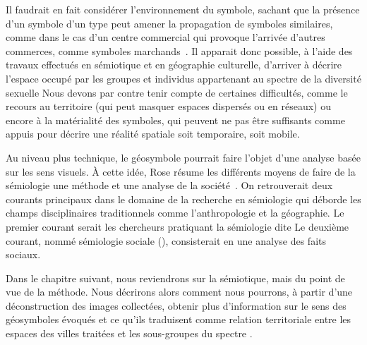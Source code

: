 Il faudrait en fait considérer l'environnement du symbole, sachant que la présence d'un symbole d'un type peut amener la propagation de symboles similaires, comme dans le cas d'un centre commercial qui provoque l'arrivée d'autres commerces, comme symboles marchands~\citep[7-8]{Monnet1998}.
Il apparait donc possible, à l'aide des travaux effectués en sémiotique et en géographie culturelle, d'arriver à décrire l'espace occupé par les groupes et individus appartenant au spectre de la diversité sexuelle
Nous devons par contre tenir compte de certaines difficultés, comme le recours au territoire (qui peut masquer espaces dispersés ou en réseaux) ou encore à la matérialité des symboles, qui peuvent ne pas être suffisants comme appuis pour décrire une réalité spatiale soit temporaire, soit mobile.

Au niveau plus technique, le géosymbole pourrait faire l'objet d'une analyse basée sur les sens visuels.
À cette idée, Rose résume les différents moyens de faire de la sémiologie une méthode et une analyse de la société~\citet[105--109]{Rose2012}.
On retrouverait deux courants principaux dans le domaine de la recherche en sémiologie qui déborde les champs disciplinaires traditionnels comme l'anthropologie et la géographie.
Le premier courant serait les chercheurs pratiquant la sémiologie dite 
Le deuxième courant, nommé sémiologie sociale (), consisterait en une analyse des faits sociaux.

Dans le chapitre suivant, nous reviendrons sur la sémiotique, mais du point de vue de la méthode.
Nous décrirons alors comment nous pourrons, à partir d'une déconstruction des images collectées, obtenir plus d'information sur le sens des géosymboles évoqués et ce qu'ils traduisent comme relation territoriale entre les espaces des villes traitées et les sous-groupes du spectre \lgbt{}.

